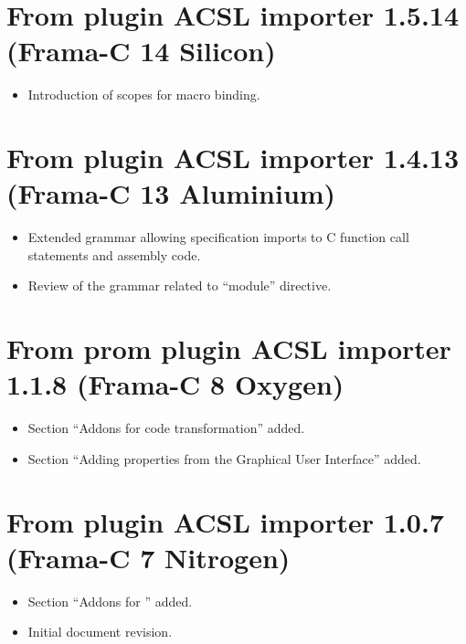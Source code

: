 \section*{From plugin ACSL importer 1.5.14 (Frama-C 14 Silicon)}
\begin{itemize}
\item Introduction of scopes for macro binding.
\end{itemize}

\section*{From plugin ACSL importer 1.4.13 (Frama-C 13 Aluminium)}
\begin{itemize}
\item Extended grammar allowing specification imports to C function call statements and assembly code.
\item Review of the grammar related to ``module'' directive.
\end{itemize}

\section*{From prom plugin ACSL importer 1.1.8 (Frama-C 8 Oxygen)}
\begin{itemize}
\item Section ``Addons for code transformation'' added.

\item Section ``Adding properties from the Graphical User Interface'' added.
\end{itemize}


\section*{From plugin ACSL importer 1.0.7 (Frama-C 7 Nitrogen) }
\begin{itemize}
\item Section ``Addons for \acsl'' added.

\item Initial document revision.
\end{itemize}
